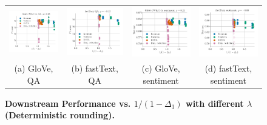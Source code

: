 \begin{figure}
\begin{tabular}{@{\hskip -0.0in}c@{\hskip -0.0in}c@{\hskip -0.0in}c@{\hskip -0.0in}c@{\hskip -0.0in}}
		\includegraphics[width=.245\linewidth]{figures/glove400k_qa_best-f1_vs_gram-large-dim-delta1-6-trans_linx_stoc.pdf} &
		\includegraphics[width=.245\linewidth]{figures/fasttext1m_qa_best-f1_vs_gram-large-dim-delta1-6-trans_linx_stoc.pdf} &
		\includegraphics[width=.245\linewidth]{figures/glove400k_sentiment_sst_test-acc_vs_gram-large-dim-delta1-6-trans_linx_stoc.pdf} &
		\includegraphics[width=.245\linewidth]{figures/fasttext1m_sentiment_sst_test-acc_vs_gram-large-dim-delta1-6-trans_linx_stoc.pdf} \\[-1em]
		(a) GloVe, QA & (b) fastText, QA  & (c) GloVe, sentiment & (d) fastText, sentiment
	\end{tabular}
	\caption{
		\textbf{Downstream Performance vs. $1/(1-\Delta_1)$ with different $\lambda$ (Deterministic rounding).}}
	\label{fig:delta1_lambda}
\end{figure}



